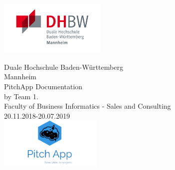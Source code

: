 \thispagestyle{plain}

\begin{titlepage}
	
		
		{\includegraphics[height=2.6cm]{fig/DHBW_MA_Logo.jpg}}	
	
	\enlargethispage{20mm}
	
	\begin{center}
		\vspace*{12mm}   Duale Hochschule Baden-Württemberg\\
		\vspace*{3mm}   Mannheim\\
		\vspace*{12mm}	{\LARGE PitchApp Documentation }\\
		\vspace*{12mm}	{\large by Team 1.}\\
		\vspace*{12mm}	 {\large Faculty of Business Informatics - Sales and Consulting}\\
		\vspace*{12mm}	20.11.2018-20.07.2019\\
		\vspace*{12mm}
		{\includegraphics[height=2.4cm]{fig/logo.png}}
		

\end{center}
\end{titlepage}
